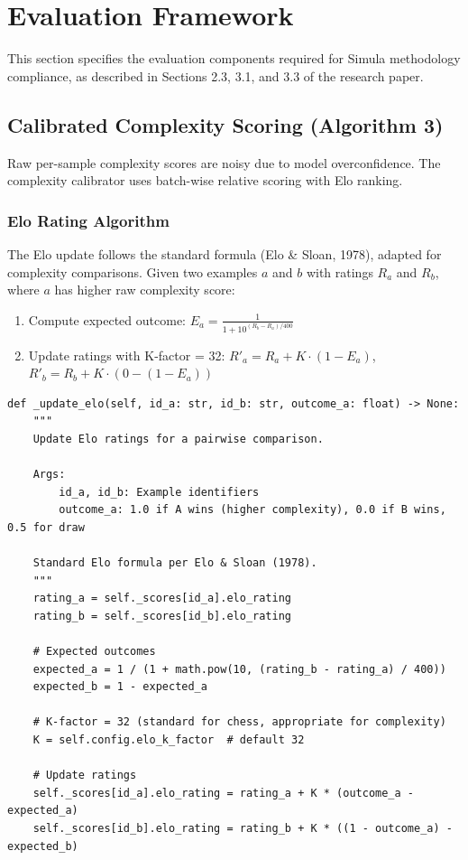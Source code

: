 \chapter{Evaluation Framework}
\label{chap:evaluation}

This section specifies the evaluation components required for Simula methodology
compliance, as described in Sections 2.3, 3.1, and 3.3 of the research paper.

\section{Calibrated Complexity Scoring (Algorithm 3)}

Raw per-sample complexity scores are noisy due to model overconfidence.
The complexity calibrator uses batch-wise relative scoring with Elo ranking.

\subsection{Elo Rating Algorithm}

The Elo update follows the standard formula (Elo \& Sloan, 1978), adapted for
complexity comparisons. Given two examples $a$ and $b$ with ratings $R_a$ and
$R_b$, where $a$ has higher raw complexity score:

\begin{enumerate}[nosep]
    \item Compute expected outcome:
          $E_a = \frac{1}{1 + 10^{(R_b - R_a)/400}}$
    \item Update ratings with K-factor = 32:
          $R'_a = R_a + K \cdot (1 - E_a)$,
          $R'_b = R_b + K \cdot (0 - (1 - E_a))$
\end{enumerate}

\begin{lstlisting}[language=jsonx,caption={Elo computation (simula\_complexity\_calibrator.py)}]
def _update_elo(self, id_a: str, id_b: str, outcome_a: float) -> None:
    """
    Update Elo ratings for a pairwise comparison.
    
    Args:
        id_a, id_b: Example identifiers
        outcome_a: 1.0 if A wins (higher complexity), 0.0 if B wins, 0.5 for draw
        
    Standard Elo formula per Elo & Sloan (1978).
    """
    rating_a = self._scores[id_a].elo_rating
    rating_b = self._scores[id_b].elo_rating
    
    # Expected outcomes
    expected_a = 1 / (1 + math.pow(10, (rating_b - rating_a) / 400))
    expected_b = 1 - expected_a
    
    # K-factor = 32 (standard for chess, appropriate for complexity)
    K = self.config.elo_k_factor  # default 32
    
    # Update ratings
    self._scores[id_a].elo_rating = rating_a + K * (outcome_a - expected_a)
    self._scores[id_b].elo_rating = rating_b + K * ((1 - outcome_a) - expected_b)
\end{lstlisting}

